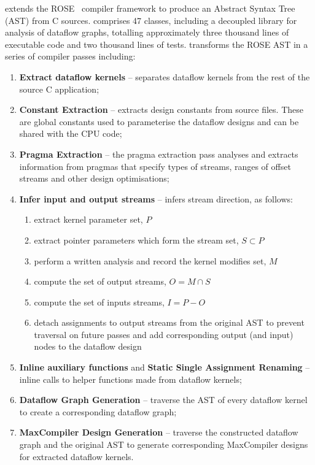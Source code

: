\fastc{} extends the ROSE~\cite{Quinlan:2000} compiler framework to
produce an Abstract Syntax Tree (AST) from C sources. \fastc{}
comprises 47 classes, including a decoupled library for analysis of
dataflow graphs, totalling approximately three thousand lines of
executable code and two thousand lines of tests. \fastc{} transforms
the ROSE AST in a series of compiler passes including:

\begin{enumerate}
\item \textbf{Extract dataflow kernels} -- separates \FAST{} dataflow
  kernels from the rest of the source C application;
\item \textbf{Constant Extraction} -- extracts design constants from
  source files. These are global constants used to parameterise
  the \FAST{} dataflow designs and can be shared with the CPU
  code;
\item \textbf{Pragma Extraction} -- the pragma extraction pass
  analyses and extracts information from pragmas that specify types of
  streams, ranges of offset streams and other design optimisations;
\item \textbf{Infer input and output streams} -- infers stream direction, as follows:
  \begin{enumerate}
  \item extract kernel parameter set, $P$
  \item extract pointer parameters which form the stream set, $ S \subset P $
  \item perform a written analysis and record the kernel modifies set, $M$
  \item compute the set of output streams, $O = M \cap S$
  \item compute the set of inputs streams, $I = P - O$
  \item detach assignments to output streams from the original AST to
    prevent traversal on future passes and add corresponding output (and
    input) nodes to the dataflow design
  \end{enumerate}
\item \textbf{Inline auxiliary functions} and \textbf{Static Single
    Assignment Renaming} -- inline calls to helper functions
  made from \FAST{} dataflow kernels;
\item \textbf{Dataflow Graph Generation} -- traverse the AST of every
  dataflow kernel to create a corresponding dataflow graph;
\item \textbf{MaxCompiler Design Generation} -- traverse the constructed
  dataflow graph and the original AST to generate corresponding MaxCompiler
  designs for extracted dataflow kernels.
\end{enumerate}
